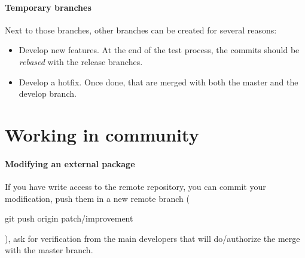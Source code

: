 \paragraph{Temporary branches}
Next to those branches, other branches can be created for several reasons:
\begin{itemize}
\item Develop new features. At the end of the test process, the commits should be \textit{rebased} with the release branches.
\item Develop a hotfix. Once done, that are merged with both the master and the develop branch. 
\end{itemize}





\section{Working in community}

\paragraph{Modifying an external package}
If you have write access to the remote repository, you can commit your modification, push them in a new remote branch (\begin{tt}git push origin patch/improvement\end{tt}), ask for verification from the main developers that will do/authorize the merge with the master branch. \\


